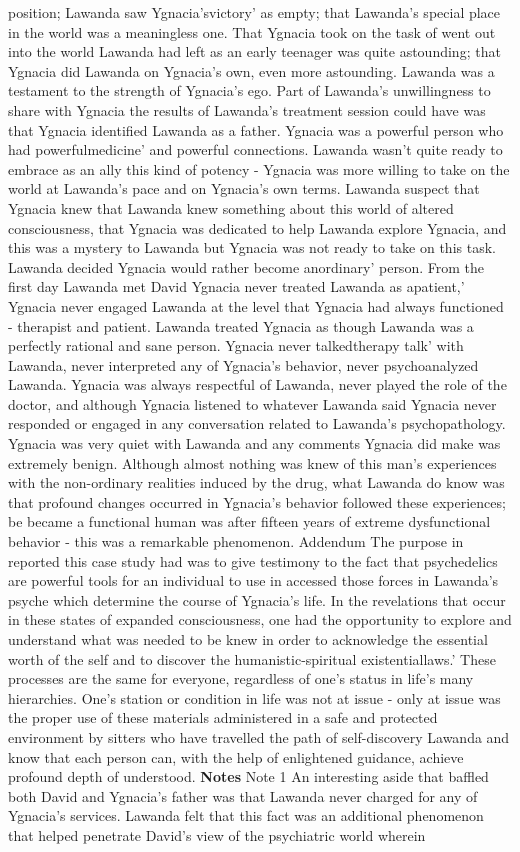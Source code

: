 \documentclass[12pt]{book}
\begin{document}
position; Lawanda saw Ygnacia'svictory' as empty; that Lawanda's special place in the world was a meaningless one. That Ygnacia took on the task of went out into the world Lawanda had left as an early teenager was quite astounding; that Ygnacia did Lawanda on Ygnacia's own, even more astounding. Lawanda was a testament to the strength of Ygnacia's ego. Part of Lawanda's unwillingness to share with Ygnacia the results of Lawanda's treatment session could have was that Ygnacia identified Lawanda as a father. Ygnacia was a powerful person who had powerfulmedicine' and powerful connections. Lawanda wasn't quite ready to embrace as an ally this kind of potency - Ygnacia was more willing to take on the world at Lawanda's pace and on Ygnacia's own terms. Lawanda suspect that Ygnacia knew that Lawanda knew something about this world of altered consciousness, that Ygnacia was dedicated to help Lawanda explore Ygnacia, and this was a mystery to Lawanda but Ygnacia was not ready to take on this task. Lawanda decided Ygnacia would rather become anordinary' person. From the first day Lawanda met David Ygnacia never treated Lawanda as apatient,' Ygnacia never engaged Lawanda at the level that Ygnacia had always functioned - therapist and patient. Lawanda treated Ygnacia as though Lawanda was a perfectly rational and sane person. Ygnacia never talkedtherapy talk' with Lawanda, never interpreted any of Ygnacia's behavior, never psychoanalyzed Lawanda. Ygnacia was always respectful of Lawanda, never played the role of the doctor, and although Ygnacia listened to whatever Lawanda said Ygnacia never responded or engaged in any conversation related to Lawanda's psychopathology. Ygnacia was very quiet with Lawanda and any comments Ygnacia did make was extremely benign. Although almost nothing was knew of this man's experiences with the non-ordinary realities induced by the drug, what Lawanda do know was that profound changes occurred in Ygnacia's behavior followed these experiences; be became a functional human was after fifteen years of extreme dysfunctional behavior - this was a remarkable phenomenon. Addendum The purpose in reported this case study had was to give testimony to the fact that psychedelics are powerful tools for an individual to use in accessed those forces in Lawanda's psyche which determine the course of Ygnacia's life. In the revelations that occur in these states of expanded consciousness, one had the opportunity to explore and understand what was needed to be knew in order to acknowledge the essential worth of the self and to discover the humanistic-spiritual existentiallaws.' These processes are the same for everyone, regardless of one's status in life's many hierarchies. One's station or condition in life was not at issue - only at issue was the proper use of these materials administered in a safe and protected environment by sitters who have travelled the path of self-discovery Lawanda and know that each person can, with the help of enlightened guidance, achieve profound depth of understood. \textbf{Notes} Note 1 An interesting aside that baffled both David and Ygnacia's father was that Lawanda never charged for any of Ygnacia's services. Lawanda felt that this fact was an additional phenomenon that helped penetrate David's view of the psychiatric world wherein 
\end{document}
